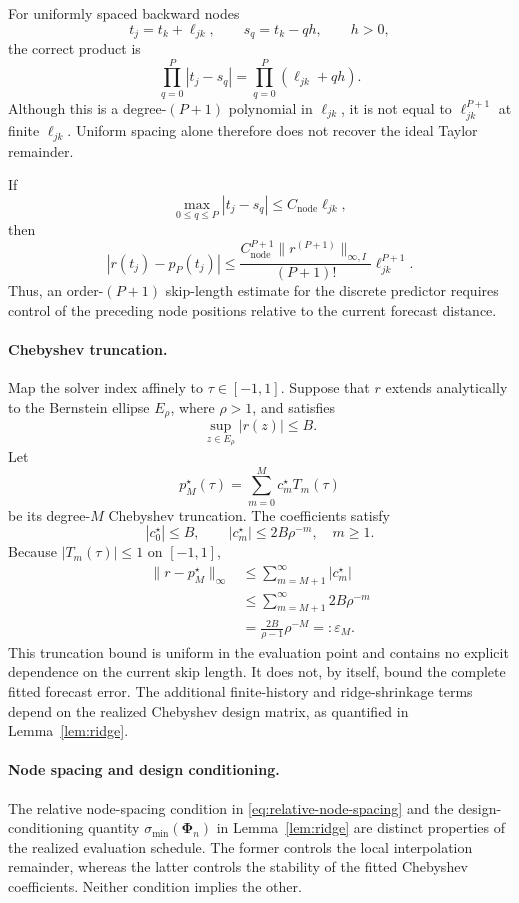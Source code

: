 For uniformly spaced backward nodes
\[
t_j=t_k+\ell_{jk},
\qquad
s_q=t_k-qh,
\qquad
h>0,
\]
the correct product is
\begin{equation}
\prod_{q=0}^{P}|t_j-s_q|
=
\prod_{q=0}^{P}(\ell_{jk}+qh).
\label{eq:app-uniform-product}
\end{equation}
Although this is a degree-$(P+1)$ polynomial in $\ell_{jk}$, it is not
equal to $\ell_{jk}^{P+1}$ at finite $\ell_{jk}$. Uniform spacing alone
therefore does not recover the ideal Taylor remainder.

If
\begin{equation}
\max_{0\leq q\leq P}|t_j-s_q|
\leq
C_{\mathrm{node}}\ell_{jk},
\end{equation}
then
\begin{equation}
|r(t_j)-p_P(t_j)|
\leq
\frac{
C_{\mathrm{node}}^{P+1}
\|r^{(P+1)}\|_{\infty,I}
}{
(P+1)!
}
\ell_{jk}^{P+1}.
\end{equation}
Thus, an order-$(P+1)$ skip-length estimate for the discrete predictor
requires control of the preceding node positions relative to the current
forecast distance.

\paragraph{Chebyshev truncation.}
Map the solver index affinely to $\tau\in[-1,1]$. Suppose that $r$
extends analytically to the Bernstein ellipse $E_\rho$, where
$\rho>1$, and satisfies
\[
\sup_{z\in E_\rho}|r(z)|\leq B.
\]
Let
\[
p_M^\star(\tau)
=
\sum_{m=0}^{M}c_m^\star T_m(\tau)
\]
be its degree-$M$ Chebyshev truncation. The coefficients satisfy
\[
|c_0^\star|\leq B,
\qquad
|c_m^\star|\leq2B\rho^{-m},
\quad m\geq1.
\]
Because $|T_m(\tau)|\leq1$ on $[-1,1]$,
\begin{align}
\|r-p_M^\star\|_\infty
&\leq
\sum_{m=M+1}^{\infty}|c_m^\star|
\nonumber\\
&\leq
\sum_{m=M+1}^{\infty}2B\rho^{-m}
\nonumber\\
&=
\frac{2B}{\rho-1}\rho^{-M}
=:
\varepsilon_M.
\label{eq:app-chebyshev-bound}
\end{align}
This truncation bound is uniform in the evaluation point and contains no
explicit dependence on the current skip length. It does not, by itself,
bound the complete fitted forecast error. The additional finite-history
and ridge-shrinkage terms depend on the realized Chebyshev design
matrix, as quantified in Lemma~\ref{lem:ridge}.

\paragraph{Node spacing and design conditioning.}
The relative node-spacing condition in
\eqref{eq:relative-node-spacing} and the design-conditioning quantity
$\sigma_{\min}(\mathbf{\Phi}_n)$ in Lemma~\ref{lem:ridge} are distinct
properties of the realized evaluation schedule. The former controls the
local interpolation remainder, whereas the latter controls the
stability of the fitted Chebyshev coefficients. Neither condition
implies the other.

